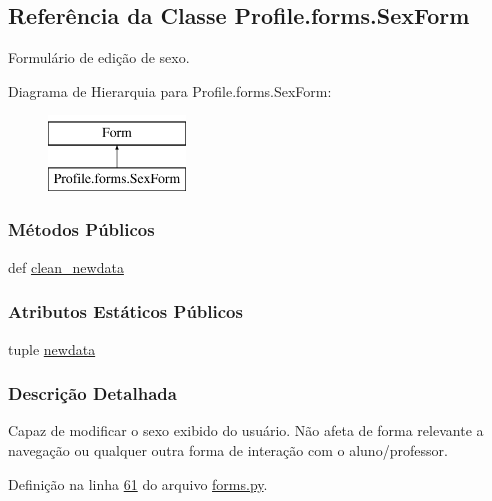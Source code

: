 \hypertarget{classProfile_1_1forms_1_1SexForm}{\subsection{Referência da Classe Profile.\-forms.\-Sex\-Form}
\label{classProfile_1_1forms_1_1SexForm}
}


Formulário de edição de sexo.  


Diagrama de Hierarquia para Profile.\-forms.\-Sex\-Form\-:\begin{figure}[H]
\begin{center}
\leavevmode
\includegraphics[height=2.000000cm]{d1/dea/classProfile_1_1forms_1_1SexForm}
\end{center}
\end{figure}
\subsubsection*{Métodos Públicos}
\begin{DoxyCompactItemize}
\item 
def \hyperlink{classProfile_1_1forms_1_1SexForm_a23eb3376f64c41fbfa57b1b78ed2a38b}{clean\-\_\-newdata}
\end{DoxyCompactItemize}
\subsubsection*{Atributos Estáticos Públicos}
\begin{DoxyCompactItemize}
\item 
tuple \hyperlink{classProfile_1_1forms_1_1SexForm_a0d99412ab99ee46149a50fabb2614845}{newdata}
\end{DoxyCompactItemize}


\subsubsection{Descrição Detalhada}
Capaz de modificar o sexo exibido do usuário. Não afeta de forma relevante a navegação ou qualquer outra forma de interação com o aluno/professor. 

Definição na linha \hyperlink{Profile_2forms_8py_source_l00061}{61} do arquivo \hyperlink{Profile_2forms_8py_source}{forms.\-py}.



